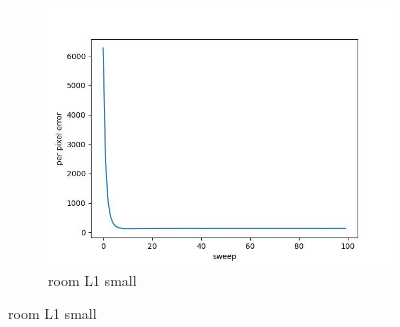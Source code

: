 \documentclass[11pt]{article}
\begin{document}
\begin{figure}[ht!]
\begin{subfigure}[]{0.333\linewidth}
        \includegraphics[width=\linewidth]{fig/loss/room_L1_small_loss.jpg}
        \caption{room L1 small}
    \end{subfigure}%
\end{figure}
\end{document}
